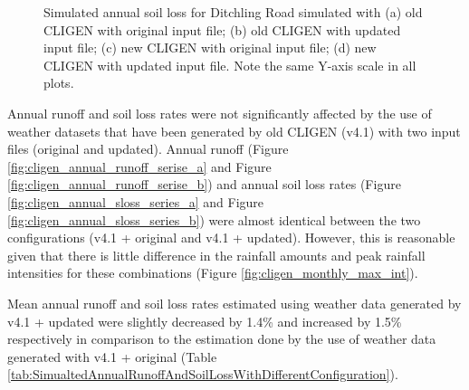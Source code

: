 \begin{figure}[htbp]
  \centering
  \qquad
  \caption[Simulated annual soil loss for Ditchling Road]{Simulated annual
soil loss for Ditchling Road simulated with (a) old CLIGEN with original input
file; (b) old CLIGEN with updated input file; (c) new CLIGEN with original input
file; (d) new CLIGEN with updated input file. Note the same Y-axis scale in all
plots.}
  \label{fig:cligen_annual_sloss_series}
\end{figure}

Annual runoff and soil loss rates were not significantly affected by the use of
weather datasets that have been generated by old CLIGEN (v4.1) with two input
files (original and updated). Annual runoff (Figure
\ref{fig:cligen_annual_runoff_serise_a} and Figure
\ref{fig:cligen_annual_runoff_serise_b}) and annual soil loss rates (Figure
\ref{fig:cligen_annual_sloss_series_a} and Figure
\ref{fig:cligen_annual_sloss_series_b}) were almost identical between the two
configurations (v4.1 + original and v4.1 + updated). However, this is reasonable
given that there is little difference in the rainfall amounts and peak rainfall
intensities for these combinations (Figure \ref{fig:cligen_monthly_max_int}).

Mean annual runoff and soil
loss rates estimated using weather data generated by v4.1 + updated were
slightly decreased by 1.4\% and increased by 1.5\% respectively in comparison to
the estimation done by the use of weather data generated with v4.1 + original
(Table \ref{tab:SimualtedAnnualRunoffAndSoilLossWithDifferentConfiguration}).

